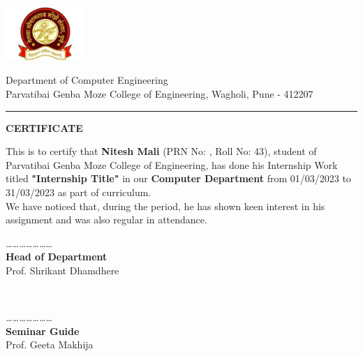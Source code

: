 \thispagestyle{plain}
\normalsize
\begin{multicols}{1}
 \flushleft
 \includegraphics[width=30mm]{Media/Logo/logo_utp.jpg}
 \columnbreak
 \par
 Department of Computer Engineering\\
 Parvatibai Genba Moze College of Engineering, Wagholi, Pune - 412207
\end{multicols}

\vspace{0.3\baselineskip}
\hrule
\vspace{1\baselineskip}

\begin{center}
{\Large {\bf \uppercase{Certificate}}}
\end{center}

\vspace{\baselineskip}
\justify
\noindent This is to certify that {\bf Nitesh Mali} (PRN No: {\textit{\myrollno}}, Roll No: 43), student of Parvatibai Genba Moze College of Engineering, has done his Internship Work titled {\bf "Internship Title"} in our {\bf Computer Department} from 01/03/2023 to 31/03/2023 as part of curriculum.\\
We have noticed that, during the period, he has shown keen interest in his assignment and was also regular in attendance.

\vspace{3\baselineskip}

\begin{minipage}{0.45\textwidth}
\begin{flushleft} \small
\emph{…………………}\\
\textbf{Head of Department}\\
Prof. Shrikant Dhamdhere \\[2.5cm]
\end{flushleft}

\end{minipage}
~
\begin{minipage}{0.45\textwidth}
\begin{flushright} \small
\emph{…………………}\\ 
\textbf{Seminar Guide}\\
Prof. Geeta Makhija\\[3.5cm]
\end{flushright}
\end{minipage}
\newpage